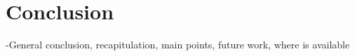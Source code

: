 \section*{Conclusion}
-General conclusion, recapitulation, main points, future work, where is available